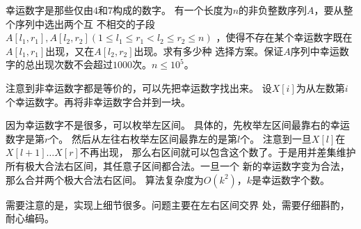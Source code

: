 \begin{prob}
	幸运数字是那些仅由$4$和$7$构成的数字。
	有一个长度为$n$的非负整数序列$A$，要从整个序列中选出两个互
	不相交的子段$A[l_1,r_1], A[l_2,r_2] (1 \le l_1 \le r_1 < l_2 \le r_2 \le n)$
	，使得不存在某个幸运数字既在$A[l_1,r_1]$出现，又在$A[l_2,r_2]$出现。求有多少种
	选择方案。保证$A$序列中幸运数字的总出现次数不会超过$1000$次。$n \le 10^5$。
\end{prob}

\begin{sol}
	注意到非幸运数字都是等价的，可以先把幸运数字找出来。
	设$X[i]$为从左数第$i$个幸运数字。再将非幸运数字合并到一块。
	\par 因为幸运数字不是很多，可以枚举左区间。
	具体的，先枚举左区间最靠右的幸运数字是第$r$个。
	然后从左往右枚举左区间最靠左的是第$l$个。
	注意到一旦$X[l]$在$X[l+1] \ldots X[r]$不再出现，
	那么右区间就可以包含这个数了。于是用并差集维护
	所有极大合法右区间，其任意子区间都合法。一旦一个
	新的幸运数字变为合法，那么合并两个极大合法右区间。
	算法复杂度为$O(k^2)$，$k$是幸运数字个数。\par
	需要注意的是，实现上细节很多。问题主要在左右区间交界
	处，需要仔细斟酌，耐心编码。
\end{sol}
